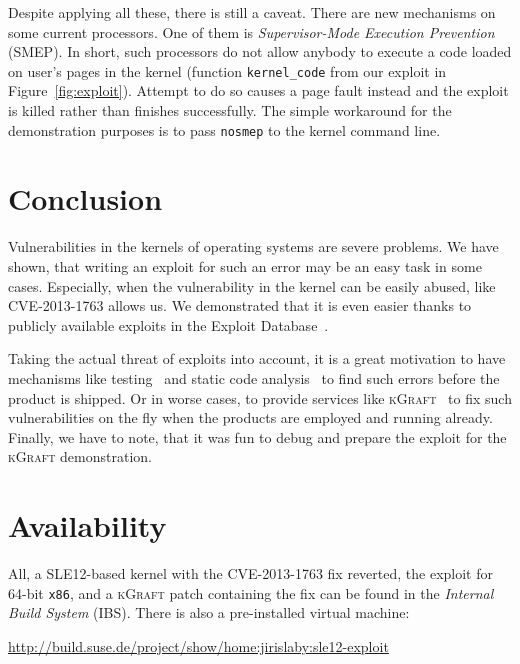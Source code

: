 \documentclass[10pt]{llncs}
\newcommand{\code}[2][]{\lstinline[columns=fullflexible, #1]$#2$}
\newcommand\kgr{\textsc{kGraft}\xspace}
\begin{document}
Despite applying all these, there is still a caveat. There are new mechanisms
on some current processors.  One of them is \emph{Supervisor-Mode Execution
Prevention}~\cite{intel} (SMEP). In short, such processors do not allow
anybody to execute a code loaded on user's pages in the kernel
(function \code{kernel_code} from our exploit in Figure~\ref{fig:exploit}).
Attempt to do so causes a page fault instead and the exploit is killed rather
than finishes successfully.  The simple workaround for the demonstration
purposes is to pass \code{nosmep} to the kernel command line.

\section{Conclusion}
Vulnerabilities in the kernels of operating systems are severe problems. We
have shown, that writing an exploit for such an error may be an easy task in
some cases. Especially, when the vulnerability in the kernel can be easily
abused, like CVE-2013-1763 allows us. We demonstrated that it is even easier
thanks to publicly available exploits in the Exploit Database~\cite{edb}.

Taking the actual threat of exploits into account, it is a great motivation to
have mechanisms like testing~\cite{dynamic} and static code
analysis~\cite{static} to find such errors before the product is shipped. Or
in worse cases, to provide services like \kgr~\cite{kgr} to fix such
vulnerabilities on the fly when the products are employed and running already.
Finally, we have to note, that it was fun to debug and prepare the exploit for
the \kgr demonstration.

\section*{Availability}
All, a SLE12-based kernel with the CVE-2013-1763 fix reverted, the exploit
for 64-bit \texttt{x86}, and a \kgr patch containing the fix can be found in
the \emph{Internal Build System} (IBS). There is also a pre-installed virtual
machine:
\begin{center}
  \url{http://build.suse.de/project/show/home:jirislaby:sle12-exploit}
\end{center}



\end{document}
